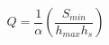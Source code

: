 \documentclass{article}
\begin{document}
\[
    Q = \frac{1}{\alpha} \left( \frac{S_{min}}{h_{max} h_s} \right)
\]
\end{document}
